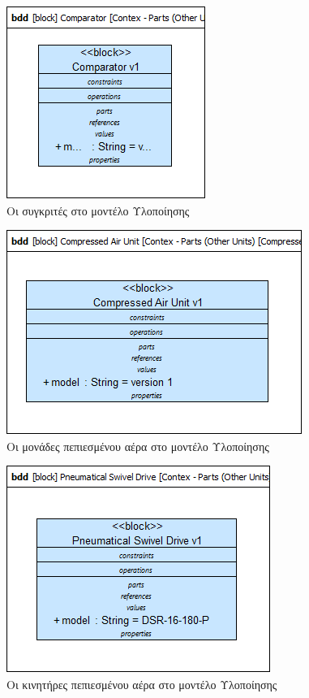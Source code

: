 \documentclass[a4paper,12pt,twoside]{report}
\begin{document}
\begin{appendices}
				\begin{figure}[hp]
					\centering
					\includegraphics[scale=0.50]{DesignModel_Contex-Parts(OtherUnits)[Comparators].png}
					\caption{Οι συγκριτές στο μοντέλο Υλοποίησης}
					\label{φωτ:Οι συγκριτές στο μοντέλο Υλοποίησης}
				\end{figure}
				
				\begin{figure}[hp]
					\centering
					\includegraphics[scale=0.50]{DesignModel_Contex-Parts(OtherUnits)[CompressedAirUnit].png}
					\caption{Οι μονάδες πεπιεσμένου αέρα στο μοντέλο Υλοποίησης}
					\label{φωτ:Οι μονάδες πεπιεσμένου αέρα στο μοντέλο Υλοποίησης}
				\end{figure}
				
				\begin{figure}[hp]
					\centering
					\includegraphics[scale=0.50]{DesignModel_Contex-Parts(OtherUnits)[PneumaticalSwivelDrive].png}
					\caption{Οι κινητήρες πεπιεσμένου αέρα στο μοντέλο Υλοποίησης}
					\label{φωτ:Οι κινητήρες πεπιεσμένου αέρα στο μοντέλο Υλοποίησης}
				\end{figure}
				

\end{appendices}
\end{document}
